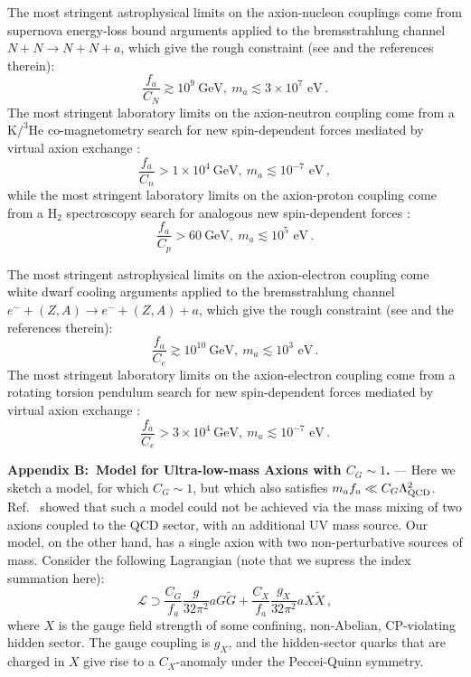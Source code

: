 The most stringent astrophysical limits on the axion-nucleon couplings come from supernova energy-loss bound arguments applied to the bremsstrahlung channel $N + N \to N + N + a$, which give the rough constraint (see \cite{Raffelt2008LNP} and the references therein):
\begin{equation}
\label{aNN_SN_limits}
\frac{f_a}{C_N} \gtrsim 10^9 ~\textrm{GeV}, ~\textrm{$m_a \lesssim 3\times 10^{7}$ eV} \, .
\end{equation}
The most stringent laboratory limits on the axion-neutron coupling come from a K$/^{3}$He co-magnetometry search for new spin-dependent forces mediated by virtual axion exchange \cite{Romalis2009_NF}:
\begin{equation}
\label{ann_lab_limits}
\frac{f_a}{C_n} > 1 \times 10^4 ~\textrm{GeV}, ~\textrm{$m_a \lesssim 10^{-7}$ eV} \, ,
\end{equation}
while the most stringent laboratory limits on the axion-proton coupling come from a H$_{2}$ spectroscopy search for analogous new spin-dependent forces \cite{Romalis2009_NF,Ramsey1979}:
\begin{equation}
\label{app_lab_limits}
\frac{f_a}{C_p} > 60 ~\textrm{GeV}, ~\textrm{$m_a \lesssim 10^{5}$ eV}  \, .
\end{equation}


The most stringent astrophysical limits on the axion-electron coupling come white dwarf cooling arguments applied to the bremsstrahlung channel $e^{-} + (Z,A) \to e^{-} + (Z,A) + a$, which give the rough constraint (see \cite{Raffelt2008LNP} and the references therein):
\begin{equation}
\label{aee_WD_limits}
\frac{f_a}{C_e} \gtrsim 10^{10} ~\textrm{GeV}, ~\textrm{$m_a \lesssim 10^3$ eV} \, .
\end{equation}
The most stringent laboratory limits on the axion-electron coupling come from a rotating torsion pendulum search for new spin-dependent forces mediated by virtual axion exchange \cite{Adelberger2013}:
\begin{equation}
\label{aee_lab_limits}
\frac{f_a}{C_e} > 3 \times 10^4 ~\textrm{GeV}, ~\textrm{$m_a \lesssim 10^{-7}$ eV} \, .
\end{equation}


\textbf{Appendix B:~Model for Ultra-low-mass Axions with $C_G\sim 1$.} ---
Here we sketch a model, for which $C_G\sim 1$, but which also satisfies $m_af_a\ll C_G\Lambda_{\rm QCD}^2$. Ref.~\cite{Blum2014} showed that such a model could not be achieved via the mass mixing of two axions coupled to the QCD sector, with an additional UV mass source.
Our model, on the other hand, has a single axion with two non-perturbative sources of mass. Consider the following Lagrangian (note that we supress the index summation here):
\begin{equation}
\label{Hidden-QCD_L}
\mathcal{L}\supset \frac{C_G}{f_a}\frac{g}{32 \pi^2}a G\tilde{G}+\frac{C_X}{f_a}\frac{g_X}{32 \pi^2}a X\tilde{X} \, ,
\end{equation}
where $X$ is the gauge field strength of some confining, non-Abelian, CP-violating hidden sector.
The gauge coupling is $g_X$, and the hidden-sector quarks that are charged in $X$ give rise to a $C_X$-anomaly under the Peccei-Quinn symmetry.

